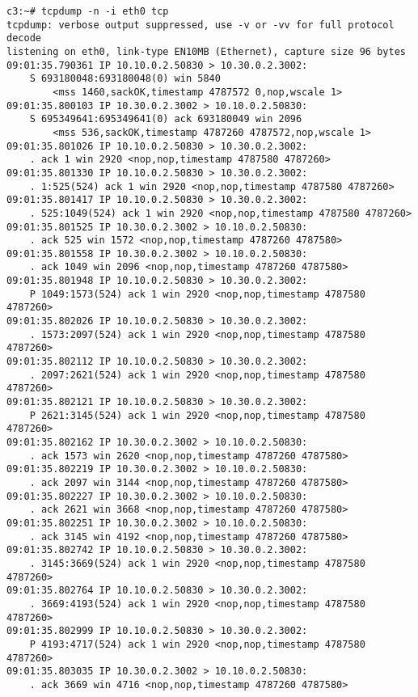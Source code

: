 \documentclass[a4paper,12pt]{article}
\begin{document}
\begin{Verbatim}
c3:~# tcpdump -n -i eth0 tcp
tcpdump: verbose output suppressed, use -v or -vv for full protocol decode
listening on eth0, link-type EN10MB (Ethernet), capture size 96 bytes
09:01:35.790361 IP 10.10.0.2.50830 > 10.30.0.2.3002: 
    S 693180048:693180048(0) win 5840 
        <mss 1460,sackOK,timestamp 4787572 0,nop,wscale 1>
09:01:35.800103 IP 10.30.0.2.3002 > 10.10.0.2.50830: 
    S 695349641:695349641(0) ack 693180049 win 2096 
        <mss 536,sackOK,timestamp 4787260 4787572,nop,wscale 1>
09:01:35.801026 IP 10.10.0.2.50830 > 10.30.0.2.3002: 
    . ack 1 win 2920 <nop,nop,timestamp 4787580 4787260>
09:01:35.801330 IP 10.10.0.2.50830 > 10.30.0.2.3002: 
    . 1:525(524) ack 1 win 2920 <nop,nop,timestamp 4787580 4787260>
09:01:35.801417 IP 10.10.0.2.50830 > 10.30.0.2.3002: 
    . 525:1049(524) ack 1 win 2920 <nop,nop,timestamp 4787580 4787260>
09:01:35.801525 IP 10.30.0.2.3002 > 10.10.0.2.50830: 
    . ack 525 win 1572 <nop,nop,timestamp 4787260 4787580>
09:01:35.801558 IP 10.30.0.2.3002 > 10.10.0.2.50830: 
    . ack 1049 win 2096 <nop,nop,timestamp 4787260 4787580>
09:01:35.801948 IP 10.10.0.2.50830 > 10.30.0.2.3002: 
    P 1049:1573(524) ack 1 win 2920 <nop,nop,timestamp 4787580 4787260>
09:01:35.802026 IP 10.10.0.2.50830 > 10.30.0.2.3002: 
    . 1573:2097(524) ack 1 win 2920 <nop,nop,timestamp 4787580 4787260>
09:01:35.802112 IP 10.10.0.2.50830 > 10.30.0.2.3002: 
    . 2097:2621(524) ack 1 win 2920 <nop,nop,timestamp 4787580 4787260>
09:01:35.802121 IP 10.10.0.2.50830 > 10.30.0.2.3002: 
    P 2621:3145(524) ack 1 win 2920 <nop,nop,timestamp 4787580 4787260>
09:01:35.802162 IP 10.30.0.2.3002 > 10.10.0.2.50830: 
    . ack 1573 win 2620 <nop,nop,timestamp 4787260 4787580>
09:01:35.802219 IP 10.30.0.2.3002 > 10.10.0.2.50830: 
    . ack 2097 win 3144 <nop,nop,timestamp 4787260 4787580>
09:01:35.802227 IP 10.30.0.2.3002 > 10.10.0.2.50830: 
    . ack 2621 win 3668 <nop,nop,timestamp 4787260 4787580>
09:01:35.802251 IP 10.30.0.2.3002 > 10.10.0.2.50830: 
    . ack 3145 win 4192 <nop,nop,timestamp 4787260 4787580>
09:01:35.802742 IP 10.10.0.2.50830 > 10.30.0.2.3002: 
    . 3145:3669(524) ack 1 win 2920 <nop,nop,timestamp 4787580 4787260>
09:01:35.802764 IP 10.10.0.2.50830 > 10.30.0.2.3002: 
    . 3669:4193(524) ack 1 win 2920 <nop,nop,timestamp 4787580 4787260>
09:01:35.802999 IP 10.10.0.2.50830 > 10.30.0.2.3002: 
    P 4193:4717(524) ack 1 win 2920 <nop,nop,timestamp 4787580 4787260>
09:01:35.803035 IP 10.30.0.2.3002 > 10.10.0.2.50830: 
    . ack 3669 win 4716 <nop,nop,timestamp 4787260 4787580>

\end{Verbatim}
\end{document}
